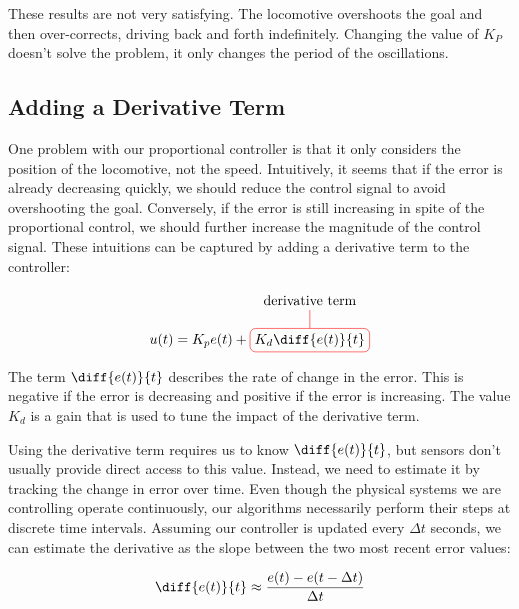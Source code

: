 These results are not very satisfying. The locomotive overshoots the
goal and then over-corrects, driving back and forth indefinitely.
Changing the value of $K_P$ doesn't solve the problem, it only changes
the period of the oscillations.


\subsection{Adding a Derivative Term}

One problem with our proportional controller is that it only considers
the position of the locomotive, not the speed.  Intuitively, it seems
that if the error is already decreasing quickly, we should reduce the
control signal to avoid overshooting the goal.  Conversely, if the
error is still increasing in spite of the proportional control, we should
further increase the magnitude of the control signal.  These
intuitions can be captured by adding a derivative term to the
controller:

\begin{equation}
u(t) = K_p e(t) +
\tikz[baseline]{
    \node[draw=red,rounded corners,anchor=base] (m1)
    {$\displaystyle K_d \diff{e(t)}{t}$};
    \node[above of=m1] (l1) {derivative term};
    \draw[-,red] (l1) -- (m1);
}
\label{eq:pd_equation}
\end{equation}


The term $\diff{e(t)}{t}$ describes the rate of change in the error.
This is negative if the error is decreasing and positive if the error
is increasing.  The value $K_d$ is a gain that is used to tune
the impact of the derivative term.

Using the derivative term requires us to know $\diff{e(t)}{t}$, but
sensors don't usually provide direct access to this value.  Instead,
we need to estimate it by tracking the change in error over time.
Even though the physical systems we are controlling operate
continuously, our algorithms necessarily perform their steps at
discrete time intervals.  Assuming our controller is updated every
$\Delta t$ seconds, we can estimate the derivative as the slope
between the two most recent error values:

\begin{equation}
\diff{e(t)}{t} \approx \frac{e(t) - e(t - \Delta t)}{\Delta t}
\label{eq:diff_approx}
\end{equation}



